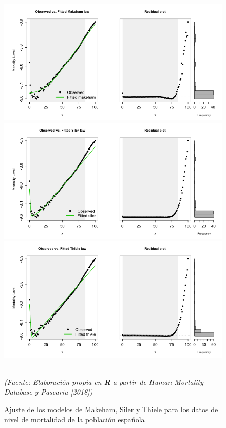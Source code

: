 \newpage
\begin{figure}[!htp]
\centering
\vspace{-0.3cm}
\includegraphics[scale=0.58]{Cap2/mortlaw03.png}

\vspace{-0.3cm}
\includegraphics[scale=0.58]{Cap2/mortlaw04.png}

\vspace{-0.3cm}
\includegraphics[scale=0.58]{Cap2/mortlaw05.png}
\captionsetup{width=1.1\linewidth}
\caption[Ajuste de los datos a los modelos de Makeham, Siler y Thiele]{Ajuste de los modelos de Makeham, Siler y Thiele para los datos de nivel de mortalidad de la población española}\\
\textit{(Fuente: Elaboración propia en \textbf{R} a partir de Human Mortality Database y Pascariu [2018])}
\end{figure}


